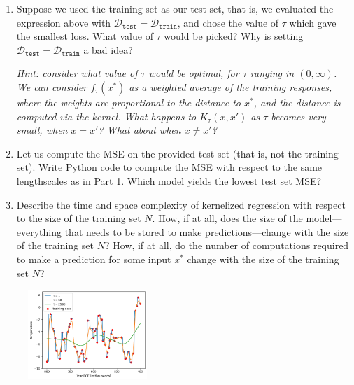 \documentclass[submit]{harvardml}
\begin{document}
\begin{problem}
\begin{enumerate}
\item Suppose we used the training set as our test set, that is, we evaluated the expression above with $\mathcal{D}_\texttt{test} = \mathcal{D}_\texttt{train}$, and chose the value of $\tau$ which gave the smallest loss.  What value of $\tau$ would be picked?  Why is setting $\mathcal{D}_\texttt{test} = \mathcal{D}_\texttt{train}$ a bad idea?
   
\emph{Hint: consider what value of $\tau$ would be optimal, for $\tau$ ranging in $(0, \infty)$. We can consider $f_\tau(x^*)$ as a weighted average of the training responses, where the weights are proportional to the distance to $x^*$, and the distance is computed via the kernel. What happens to $K_\tau(x, x')$ as $\tau$ becomes very small, when $x = x'$? What about when $x \neq x'$?}

\item Let us compute the MSE on the provided test set (that is, not the training set). Write Python code to compute the MSE with respect to the same lengthscales as in Part 1. Which model yields the lowest test set MSE? 

\item Describe the time and space complexity of kernelized regression with respect to the size of the training set $N$.  How, if at all, does the size of the model---everything that needs to be stored to make predictions---change with the size of the training set $N$?  How, if at all, do the number of computations required to make a prediction for some input $x^*$ change with the size of the training set $N$?

\end{enumerate}

\end{problem}


\newpage
\begin{figure}
  \centering
  \includegraphics[width=0.4\textwidth]{tau_plot.png}
\end{figure}
\end{document}

